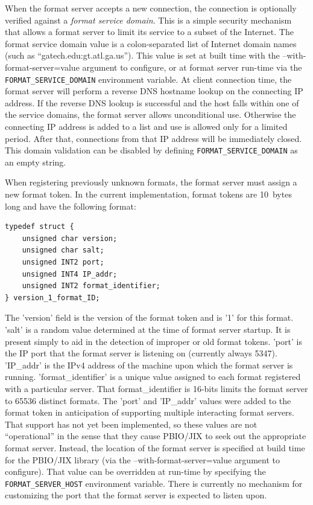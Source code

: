\documentclass{article}
\begin{document}
When the format server accepts a new connection, the connection is
optionally verified against a {\it format service domain}.  This is a simple
security mechanism that allows a format server to limit its service to a
subset of the Internet.  The format service domain value is a
colon-separated list of Internet domain names (such as
``gatech.edu:gt.atl.ga.us'').  This value is set at built time with the
--with-format-server=value argument to configure, or at format server
run-time via the {\tt FORMAT\_SERVICE\_DOMAIN} environment variable.  At
client connection time, the format server will perform a reverse DNS
hostname lookup on the connecting IP address.  If the reverse DNS lookup is
successful and the host falls within one of the service domains, the format
server allows unconditional use.  Otherwise the connecting IP address is
added to a list and use is allowed only for a limited period.  After that,
connections from that IP address will be immediately closed.  This domain
validation can be disabled by defining {\tt FORMAT\_SERVICE\_DOMAIN} as an
empty string.

When registering previously unknown formats, the format server must assign a
new format token.  In the current implementation, format tokens are 10~bytes
long and have the following format:
\begin{verbatim}
typedef struct {
    unsigned char version;
    unsigned char salt;
    unsigned INT2 port;
    unsigned INT4 IP_addr;
    unsigned INT2 format_identifier;
} version_1_format_ID;
\end{verbatim}
The 'version' field is the version of the format token and is '1' for this
format.  'salt' is a random value determined at the time of format server
startup.  It is present simply to aid in the detection of improper or old
format tokens.  'port' is the IP port that the format server is listening on
(currently always 5347).  'IP\_addr' is the IPv4 address of the machine upon
which the format server is running.  'format\_identifier' is a unique value
assigned to each format registered with a particular server.  That
format\_identifier is 16-bits limits the format server to 65536 distinct
formats.  The 'port' and 'IP\_addr' values were added to the format token in
anticipation of supporting multiple interacting format servers.  That
support has not yet been implemented, so these values are not
``operational'' in the sense that they cause PBIO/JIX to seek out the
appropriate format server.  Instead, the location of the format server is
specified at build time for the PBIO/JIX library (via the
--with-format-server=value argument to configure).  That value can be
overridden at run-time by specifying the {\tt FORMAT\_SERVER\_HOST}
environment variable.   There is currently no mechanism for customizing the
port that the format server is expected to listen upon.
\end{document}
